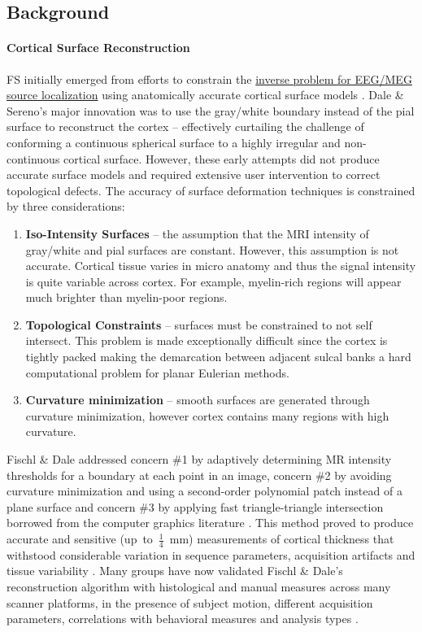 \documentclass[paper=a4, fontsize=11pt]{scrartcl} %
\numberwithin{equation}{section} %
\numberwithin{figure}{section} %
\numberwithin{table}{section} %
\begin{document}
\subsection{Background}
\paragraph{Cortical Surface Reconstruction} FS initially emerged from efforts to constrain the \href{http://www.scholarpedia.org/article/Source_localization}{inverse problem for EEG/MEG source localization} using anatomically accurate cortical surface models \cite{dale_improved_1993}.  Dale \& Sereno's major innovation was to use the gray/white boundary instead of the pial surface to reconstruct the cortex -- effectively curtailing the challenge of conforming a continuous spherical surface to a highly irregular and non-continuous cortical surface.  However, these early attempts did not produce accurate surface models and required extensive user intervention to correct topological defects. The accuracy of surface deformation techniques is constrained by three considerations:
\begin{enumerate}
\item \textbf{Iso-Intensity Surfaces} -- the assumption that the MRI intensity of gray/white and pial surfaces are constant. However, this assumption is not accurate. Cortical tissue varies in micro anatomy and thus the signal intensity is quite variable across cortex.  For example, myelin-rich regions will appear much brighter than myelin-poor regions.
\item \textbf{Topological Constraints} -- surfaces must be constrained to not self intersect.  This problem is made exceptionally difficult since the cortex is tightly packed making the demarcation between adjacent sulcal banks a hard computational problem for planar Eulerian methods.
\item \textbf{Curvature minimization} -- smooth surfaces are generated through curvature minimization, however cortex contains many regions with high curvature.
\end{enumerate}

Fischl \& Dale addressed concern \#1 by adaptively determining MR intensity thresholds for a boundary at each point in an image, concern \#2 by avoiding curvature minimization and using a second-order polynomial patch instead of a plane surface and concern \#3 by applying fast triangle-triangle intersection borrowed from the computer graphics literature \cite{fischl_measuring_2000}.  This method proved to produce accurate and sensitive \mbox{(up to $\frac{1}{4}$ mm)} measurements of cortical thickness that withstood considerable variation in sequence parameters, acquisition artifacts and tissue variability \cite{fischl_automated_2001}.  Many groups have now validated Fischl \& Dale's reconstruction algorithm with histological and manual measures across many scanner platforms, in the presence of subject motion, different acquisition parameters, correlations with behavioral measures and analysis types \cite{dickerson_detection_2008,  han_reliability_2006, rosas_regional_2002, ReutEtal14, vonEconomo}.  
\end{document}
